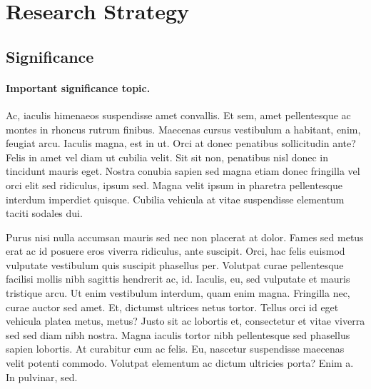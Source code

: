 \documentclass[
  11pt,
  letterpaper,
  DIV=11,
  numbers=noendperiod]{scrartcl}
\author{}
\date{}
\let\oldparagraph\paragraph
\renewcommand{\paragraph}[1]{\oldparagraph{#1}\mbox{}}
\begin{document}
\ifdefined\Shaded\renewenvironment{Shaded}{\begin{tcolorbox}[boxrule=0pt, borderline west={3pt}{0pt}{shadecolor}, enhanced, frame hidden, interior hidden, sharp corners, breakable]}{\end{tcolorbox}}\fi

\hypertarget{research-strategy}{%
\section{Research Strategy}\label{research-strategy}}

\hypertarget{significance}{%
\subsection{Significance}\label{significance}}

\hypertarget{important-significance-topic.}{%
\paragraph{Important significance
topic.}\label{important-significance-topic.}}

Ac, iaculis himenaeos suspendisse amet convallis. Et sem, amet
pellentesque ac montes in rhoncus rutrum finibus. Maecenas cursus
vestibulum a habitant, enim, feugiat arcu. Iaculis magna, est in ut.
Orci at donec penatibus sollicitudin ante? Felis in amet vel diam ut
cubilia velit. Sit sit non, penatibus nisl donec in tincidunt mauris
eget. Nostra conubia sapien sed magna etiam donec fringilla vel orci
elit sed ridiculus, ipsum sed. Magna velit ipsum in pharetra
pellentesque interdum imperdiet quisque. Cubilia vehicula at vitae
suspendisse elementum taciti sodales dui.

Purus nisi nulla accumsan mauris sed nec non placerat at dolor. Fames
sed metus erat ac id posuere eros viverra ridiculus, ante suscipit.
Orci, hac felis euismod vulputate vestibulum quis suscipit phasellus
per. Volutpat curae pellentesque facilisi mollis nibh sagittis hendrerit
ac, id. Iaculis, eu, sed vulputate et mauris tristique arcu. Ut enim
vestibulum interdum, quam enim magna. Fringilla nec, curae auctor sed
amet. Et, dictumst ultrices netus tortor. Tellus orci id eget vehicula
platea metus, metus? Justo sit ac lobortis et, consectetur et vitae
viverra sed sed diam nibh nostra. Magna iaculis tortor nibh pellentesque
sed phasellus sapien lobortis. At curabitur cum ac felis. Eu, nascetur
suspendisse maecenas velit potenti commodo. Volutpat elementum ac dictum
ultricies porta? Enim a. In pulvinar, sed.
\end{document}

